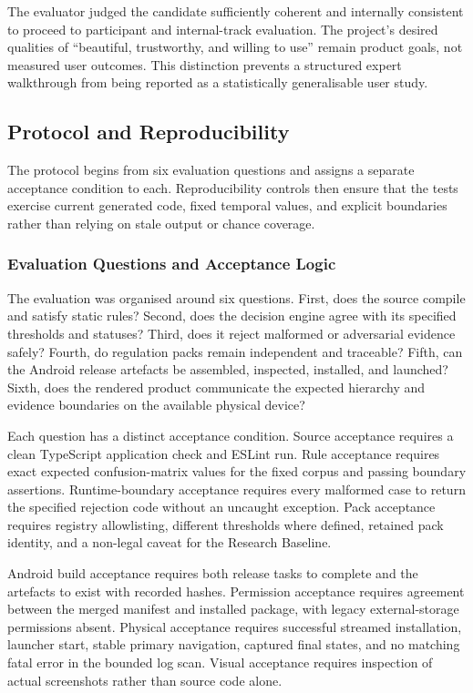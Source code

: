 The evaluator judged the candidate sufficiently coherent and internally consistent to proceed to participant and internal-track evaluation. The project's desired qualities of ``beautiful, trustworthy, and willing to use'' remain product goals, not measured user outcomes. This distinction prevents a structured expert walkthrough from being reported as a statistically generalisable user study.

\subsection{Protocol and Reproducibility}

The protocol begins from six evaluation questions and assigns a separate acceptance condition to each. Reproducibility controls then ensure that the tests exercise current generated code, fixed temporal values, and explicit boundaries rather than relying on stale output or chance coverage.

\subsubsection{Evaluation Questions and Acceptance Logic}

The evaluation was organised around six questions. First, does the source compile and satisfy static rules? Second, does the decision engine agree with its specified thresholds and statuses? Third, does it reject malformed or adversarial evidence safely? Fourth, do regulation packs remain independent and traceable? Fifth, can the Android release artefacts be assembled, inspected, installed, and launched? Sixth, does the rendered product communicate the expected hierarchy and evidence boundaries on the available physical device?

Each question has a distinct acceptance condition. Source acceptance requires a clean TypeScript application check and ESLint run. Rule acceptance requires exact expected confusion-matrix values for the fixed corpus and passing boundary assertions. Runtime-boundary acceptance requires every malformed case to return the specified rejection code without an uncaught exception. Pack acceptance requires registry allowlisting, different thresholds where defined, retained pack identity, and a non-legal caveat for the Research Baseline.

Android build acceptance requires both release tasks to complete and the artefacts to exist with recorded hashes. Permission acceptance requires agreement between the merged manifest and installed package, with legacy external-storage permissions absent. Physical acceptance requires successful streamed installation, launcher start, stable primary navigation, captured final states, and no matching fatal error in the bounded log scan. Visual acceptance requires inspection of actual screenshots rather than source code alone.

